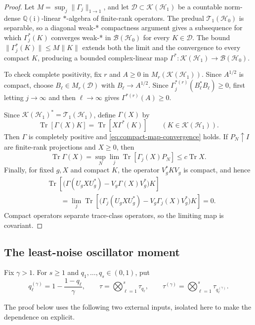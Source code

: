 \documentclass[11pt]{article}
\theoremstyle{remark}
\theoremstyle{plain}
\newcommand{\cH}{\mathcal H}
\newcommand{\cT}{\mathcal T}
\newcommand{\Tr}{\operatorname{Tr}}
\begin{document}
\begin{proof}
Let \(M=\sup_j\|\Gamma_j\|_{1\to1}\), and let
\(\mathcal D\subset\mathcal K(\cH_1)\) be a countable norm-dense
\(\mathbb Q(\mathrm i)\)-linear \(*\)-algebra of finite-rank operators.
The predual \(\cT_1(\cH_0)\) is separable, so a diagonal weak-* compactness
argument gives a subsequence for which
\(\Gamma_j^*(K)\) converges weak-* in \(\mathcal B(\cH_0)\) for every
\(K\in\mathcal D\).  The bound
\(\|\Gamma_j^*(K)\|\le M\|K\|\) extends both the limit and the convergence
to every compact \(K\), producing a
bounded complex-linear map
\(\Gamma^*:\mathcal K(\cH_1)\to\mathcal B(\cH_0)\).

To check complete positivity, fix \(r\) and \(A\ge0\) in
\(M_r(\mathcal K(\cH_1))\).  Since \(A^{1/2}\) is compact, choose
\(B_\ell\in M_r(\mathcal D)\) with \(B_\ell\to A^{1/2}\).  Since
\(\Gamma_j^{*(r)}(B_\ell^*B_\ell)\ge0\), first letting \(j\to\infty\) and
then \(\ell\to\infty\) gives \(\Gamma^{*(r)}(A)\ge0\).

Since \(\mathcal K(\cH_1)^*=\cT_1(\cH_1)\), define \(\Gamma(X)\) by
\[
  \Tr[\Gamma(X)K]=\Tr[X\Gamma^*(K)]
  \qquad(K\in\mathcal K(\cH_1)).
\]
Then \(\Gamma\) is completely positive and
\eqref{eq:compact-map-convergence} holds.  If \(P_N\uparrow I\) are
finite-rank projections and \(X\ge0\), then
\[
  \Tr\Gamma(X)
  =\sup_N\lim_j\Tr[\Gamma_j(X)P_N]
  \le c\Tr X.
\]
Finally, for fixed \(g,X\) and compact \(K\), the operator
\(V_g^*KV_g\) is compact, and hence
\[
\begin{aligned}
  &\Tr\!\left[
    \bigl(\Gamma(U_gXU_g^*)-V_g\Gamma(X)V_g^*\bigr)K
  \right]\\
  &\qquad=\lim_j\Tr\!\left[
    \bigl(\Gamma_j(U_gXU_g^*)-V_g\Gamma_j(X)V_g^*\bigr)K
  \right]=0.
\end{aligned}
\]
Compact operators separate trace-class operators, so the limiting map is
covariant.
\end{proof}

\subsection{The least-noise oscillator moment}

Fix \(\gamma>1\).  For \(s\ge1\) and
\(q_1,\ldots,q_s\in(0,1)\), put
\[
  q_\ell^{(\gamma)}=1-\frac{1-q_\ell}{\gamma},
  \qquad
  \tau=\bigotimes_{\ell=1}^s\tau_{q_\ell},
  \qquad
  \tau^{(\gamma)}
  =\bigotimes_{\ell=1}^s\tau_{q_\ell^{(\gamma)}}.
\]

The proof below uses the following two external inputs, isolated here to make
the dependence on \cite{GutaMatsumoto2006MixedGaussianCloning} explicit.
\end{document}
